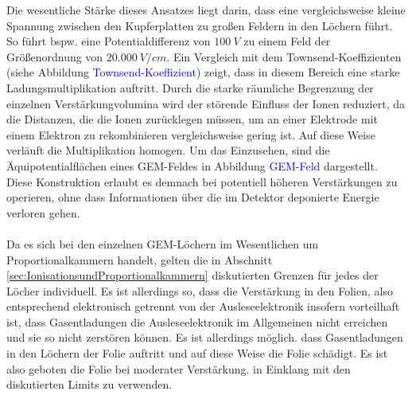 \noindent Die wesentliche Stärke dieses Ansatzes liegt darin, dass eine vergleichsweise kleine Spannung zwischen den Kupferplatten zu großen Feldern in den Löchern führt. So führt bspw. eine Potentialdifferenz von $100\ \si{V} $ zu einem Feld der Größenordnung von $20.000\ \si{V/cm}$. Ein Vergleich mit dem Townsend-Koeffizienten (siehe Abbildung \textcolor{blue}{Townsend-Koeffizient}) zeigt, dass in diesem Bereich eine starke Ladungsmultiplikation auftritt. Durch die starke räumliche Begrenzung der einzelnen Verstärkungvolumina wird der störende Einfluss der Ionen reduziert, da die Distanzen, die die Ionen zurücklegen müssen, um an einer Elektrode mit einem Elektron zu rekombinieren vergleichsweise gering ist. Auf diese Weise verläuft die Multiplikation homogen. Um das Einzusehen, sind die Äquipotentialflächen eines GEM-Feldes in Abbildung \textcolor{blue}{GEM-Feld} dargestellt. Diese Konstruktion erlaubt es demnach bei potentiell höheren Verstärkungen zu operieren, ohne dass Informationen über die im Detektor deponierte Energie verloren gehen. \\
\\
Da es sich bei den einzelnen GEM-Löchern im Wesentlichen um Proportionalkammern handelt, gelten die in Abschnitt \ref{sec:IonisationsundProportionalkammern} diskutierten Grenzen für jedes der Löcher individuell. Es ist allerdings so, dass die Verstärkung in den Folien, also entsprechend elektronisch getrennt von der Ausleseelektronik insofern vorteilhaft ist, dass Gasentladungen die Ausleseelektronik im Allgemeinen nicht erreichen und sie so nicht zerstören können. Es ist allerdings möglich. dass Gasentladungen in den Löchern der Folie auftritt und auf diese Weise die Folie schädigt. Es ist also geboten die Folie bei moderater Verstärkung. in Einklang mit den diskutierten Limits zu verwenden.
			



